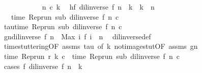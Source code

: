 \begin{isabellebody}
\ \ \isamarkupfalse%
\ {\isacharminus}\isanewline
\ \ \ \ \isacommand{{\isacharbraceleft}}\isamarkupfalse%
\ \isamarkupfalse%
\ n\ c\ k\ \isamarkupfalse%
\ h{\isacharcolon}{\isacartoucheopen}f\ {\isacharparenleft}{\isacharparenleft}dil{\isacharunderscore}inverse\ f{\isacharparenright}\ n{\isacharparenright}\ {\isasymle}\ k\ {\isasymand}\ k\ {\isasymle}\ n{\isacartoucheclose}\isanewline
\ \ \ \ \ \ \isamarkupfalse%
\ {\isacharquery}{\isasymtau}\ {\isacharequal}\ {\isacartoucheopen}time\ {\isacharparenleft}Rep{\isacharunderscore}run\ sub\ {\isacharparenleft}{\isacharparenleft}dil{\isacharunderscore}inverse\ f{\isacharparenright}\ n{\isacharparenright}\ c{\isacharparenright}{\isacartoucheclose}\isanewline
\ \ \ \ \ \ \isamarkupfalse%
\ tau{\isacharcolon}{\isacartoucheopen}time\ {\isacharparenleft}Rep{\isacharunderscore}run\ sub\ {\isacharparenleft}{\isacharparenleft}dil{\isacharunderscore}inverse\ f{\isacharparenright}\ n{\isacharparenright}\ c{\isacharparenright}\ {\isacharequal}\ {\isacharquery}{\isasymtau}{\isacartoucheclose}\ \isacommand{{\isachardot}{\isachardot}}\isamarkupfalse%
\isanewline
\ \ \ \ \ \ \isamarkupfalse%
\ gn{\isacharcolon}{\isacartoucheopen}{\isacharparenleft}dil{\isacharunderscore}inverse\ f{\isacharparenright}\ n\ {\isacharequal}\ Max\ {\isacharbraceleft}i{\isachardot}\ f\ i\ {\isasymle}\ n{\isacharbraceright}{\isacartoucheclose}\ \isamarkupfalse%
\ dil{\isacharunderscore}inverse{\isacharunderscore}def\ \isacommand{{\isachardot}{\isachardot}}\isamarkupfalse%
\isanewline
\ \ \ \ \ \ \isamarkupfalse%
\ time{\isacharunderscore}stuttering{\isacharbrackleft}OF\ assms\ tau{\isacharcomma}\ of\ k{\isacharbrackright}\ not{\isacharunderscore}image{\isacharunderscore}stut{\isacharbrackleft}OF\ assms\ gn{\isacharbrackright}\isanewline
\ \ \ \ \ \ \isamarkupfalse%
\ {\isacartoucheopen}time\ {\isacharparenleft}{\isacharparenleft}Rep{\isacharunderscore}run\ r{\isacharparenright}\ k\ c{\isacharparenright}\ {\isacharequal}\ time\ {\isacharparenleft}{\isacharparenleft}Rep{\isacharunderscore}run\ sub{\isacharparenright}\ {\isacharparenleft}{\isacharparenleft}dil{\isacharunderscore}inverse\ f{\isacharparenright}\ n{\isacharparenright}\ c{\isacharparenright}{\isacartoucheclose}\isanewline
\ \ \ \ \ \ \isamarkupfalse%
\ {\isacharparenleft}cases\ {\isacartoucheopen}f\ {\isacharparenleft}{\isacharparenleft}dil{\isacharunderscore}inverse\ f{\isacharparenright}\ n{\isacharparenright}\ {\isacharequal}\ k{\isacartoucheclose}{\isacharparenright}\isanewline

\end{isabellebody}
